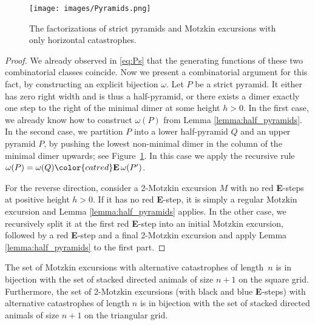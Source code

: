 \begin{figure}[hbt!]
  \centering
  \texttt{[image: images/Pyramids.png]}
  \caption[The factorization of Motzkin excursions with only horizontal catastrophes.]{The factorizations of strict pyramids and Motzkin excursions with only horizontal catastrophes.}
  \label{fig:pyramids}
\end{figure}


\begin{proof}
  We already observed in \eqref{eq:Ps} that the generating functions of these two combinatorial classes coincide. Now we present a combinatorial argument for this fact, by constructing an explicit bijection $\omega$.
  Let $P$ be a strict pyramid. It either has zero right width and is thus a half-pyramid, or there exists a dimer exactly one step to the right of the minimal dimer at some height $h > 0$. In the first case, we already know how to construct $\omega(P)$ from Lemma \ref{lemma:half_pyramids}.
  In the second case, we partition $P$ into a lower half-pyramid $Q$ and an upper pyramid $P$, by pushing the lowest non-minimal dimer in the column of the minimal dimer upwards; see Figure~\ref{fig:pyramids}. In this case we apply the recursive rule $\omega(P) = \omega(Q) {\color{catred} \textbf{E}}\, \omega(P')$.

  For the reverse direction, consider a 2-Motzkin excursion $M$ with no red {\color{catred}\textbf{E}}-steps at positive height $h > 0$. If it has no red {\color{catred} \textbf{E}}-step, it is simply a regular Motzkin excursion and Lemma \ref{lemma:half_pyramids} applies. In the other case, we recursively split it at the first red {\color{catred} \textbf{E}}-step into an initial Motzkin excursion, followed by a red {\color{catred} \textbf{E}}-step and a final 2-Motzkin excursion and apply Lemma \ref{lemma:half_pyramids} to the first part.
\end{proof}

\begin{theorem} \label{thm:bijection}
  The set of Motzkin excursions with alternative catastrophes of length~$n$ is in bijection with the set of stacked directed animals of size $n +1$ on the square grid.
  Furthermore, the set of 2-Motzkin excursions (with black and blue \textbf{E}-steps) with alternative catastrophes of length $n$ is in bijection with the set of stacked directed animals of size $n + 1$ on the triangular grid.
\end{theorem}

